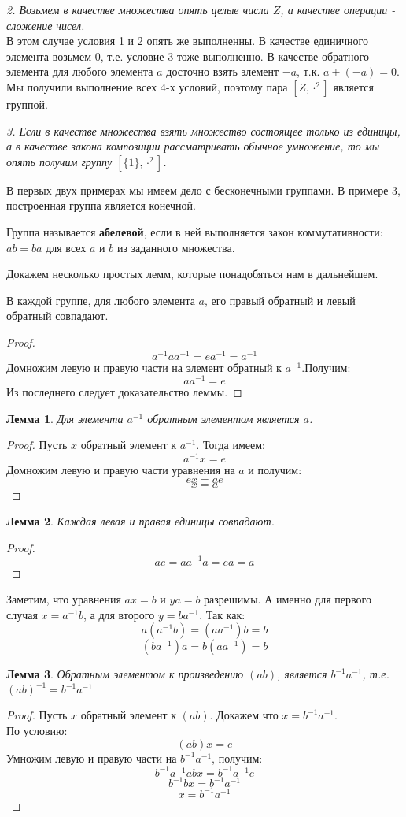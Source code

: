 {\textit{2. Возьмем в качестве множества опять целые числа $Z$, а качестве операции - сложение чисел.}\\
В этом случае условия 1 и 2 опять же выполненны. В качестве единичного элемента возьмем $0$, т.е. условие 3 тоже выполненно. В качестве обратного элемента для любого элемента $a$ досточно взять элемент $-a$, т.к. $a+(-a)=0$. Мы получили выполнение всех 4-х условий, поэтому пара $[Z, \cdot^2]$ является группой.

\textit{3. Если в качестве множества взять множество состоящее только из единицы, а в качестве закона композиции рассматривать обычное умножение, то мы опять получим группу $[\{1\},\cdot^2]$.}

В первых двух примерах мы имеем дело с бесконечными группами. В примере 3, построенная группа является конечной.
\begin{Def}
Группа называется \textbf{абелевой}, если в ней выполняется закон коммутативности: $ab=ba$ для всех $a$ и $b$ из заданного множества.
\end{Def}
Докажем несколько простых лемм, которые понадобяться нам в дальнейшем.
\newtheorem{Lem}{Лемма}
\begin{Thr}
В каждой группе, для любого элемента \textbf{$a$}, его правый обратный и левый обратный совпадают.
\end{Thr} 
\begin{proof}
$$a^{-1}aa^{-1}=ea^{-1}=a^{-1}$$
Домножим левую и правую части на элемент обратный к $a^{-1}$.Получим:
$$aa^{-1}=e$$
Из последнего следует доказательство леммы.
\end{proof}
\begin{Lem}
Для элемента $a^{-1}$ обратным элементом является $a$.
\end{Lem}
\begin{proof}
Пусть $x$ обратный элемент к $a^{-1}$. Тогда имеем:
$$a^{-1}x=e$$
Домножим левую и правую части уравнения на $a$ и получим:
$$ex=ae$$
$$x=a$$
\end{proof}
\begin{Lem}
Каждая левая и правая единицы совпадают.
\end{Lem}
\begin{proof}
$$ae=aa^{-1}a=ea=a$$
\end{proof}
Заметим, что уравнения $ax=b$ и $ya=b$ разрешимы. А именно для первого случая $x=a^{-1}b$, а для второго $y=ba^{-1}.$ Так как:
$$a(a^{-1}b)=(aa^{-1})b=b$$
$$(ba^{-1})a=b(aa^{-1})=b$$

\begin{Lem}
Обратным элементом к произведению $(ab)$, является $b^{-1}a^{-1}$, т.е. $(ab)^{-1}=b^{-1}a^{-1}$
\end{Lem}
\begin{proof}
Пусть $x$ обратный элемент к $(ab)$. Докажем что $x=b^{-1}a^{-1}$. \\По условию:
$$ (ab)x=e$$
Умножим левую и правую части на $b^{-1}a^{-1}$, получим:
$$b^{-1}a^{-1}abx=b^{-1}a^{-1}e$$
$$b^{-1}bx=b^{-1}a^{-1}$$
$$x=b^{-1}a^{-1}$$
\end{proof}
}
